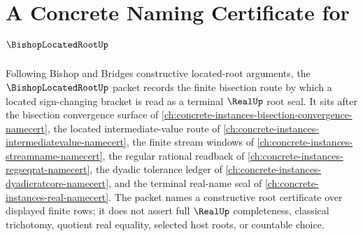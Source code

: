 \chapter{A Concrete Naming Certificate for $\BishopLocatedRootUp$}
\label{ch:concrete-instances-bishop-located-root-namecert}

Following Bishop and Bridges constructive located-root arguments, the $\BishopLocatedRootUp$ packet records the finite bisection route by which a located sign-changing bracket is read as a terminal $\RealUp$ root seal. It sits after the bisection convergence surface of \autoref{ch:concrete-instances-bisection-convergence-namecert}, the located intermediate-value route of \autoref{ch:concrete-instances-intermediatevalue-namecert}, the finite stream windows of \autoref{ch:concrete-instances-streamname-namecert}, the regular rational readback of \autoref{ch:concrete-instances-regseqrat-namecert}, the dyadic tolerance ledger of \autoref{ch:concrete-instances-dyadicratcore-namecert}, and the terminal real-name seal of \autoref{ch:concrete-instances-real-namecert}. The packet names a constructive root certificate over displayed finite rows; it does not assert full $\RealUp$ completeness, classical trichotomy, quotient real equality, selected host roots, or countable choice.

